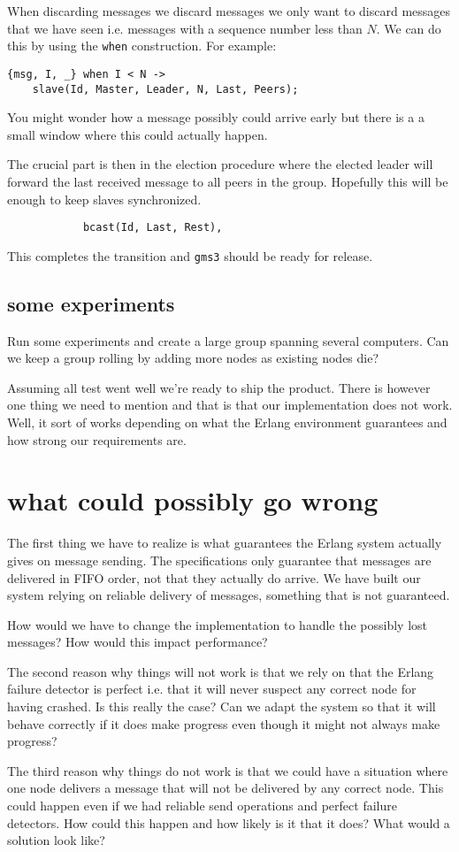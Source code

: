 \documentclass[a4paper,11pt]{article}
\begin{document}
When discarding messages we discard messages we only want to discard
messages that we have seen i.e. messages with a sequence number less
than $N$. We can do this by using the {\tt when} construction. For example:

\begin{verbatim}
{msg, I, _} when I < N ->
    slave(Id, Master, Leader, N, Last, Peers);
\end{verbatim}

You might wonder how a message possibly could arrive early but there
is a a small window where this could actually happen.

The crucial part is then in the election procedure where the elected
leader will forward the last received message to all peers in the
group. Hopefully this will be enough to keep slaves synchronized.

\begin{verbatim}
            bcast(Id, Last, Rest),
\end{verbatim}

This completes the transition and {\tt gms3} should be ready for
release. 

\subsection{some experiments}

Run some experiments and create a large group spanning several
computers. Can we keep a group rolling by adding more nodes as
existing nodes die?

Assuming all test went well we're ready to ship the product. There is
however one thing we need to mention and that is that our
implementation does not work. Well, it sort of works depending on what
the Erlang environment guarantees and how strong our requirements are.

\section{what could possibly go wrong}

The first thing we have to realize is what guarantees the Erlang
system actually gives on message sending. The specifications only
guarantee that messages are delivered in FIFO order, not that they
actually do arrive. We have built our system relying on reliable
delivery of messages, something that is not guaranteed.

How would we have to change the implementation to handle the possibly
lost messages? How would this impact performance?

The second reason why things will not work is that we rely on that the
Erlang failure detector is perfect i.e. that it will never suspect any
correct node for having crashed. Is this really the case? Can we adapt
the system so that it will behave correctly if it does make progress
even though it might not always make progress?

The third reason why things do not work is that we could have a
situation where one node delivers a message that will not be delivered
by any correct node. This could happen even if we had reliable send
operations and perfect failure detectors.  How could this happen and
how likely is it that it does?  What would a solution look like?
\end{document}
